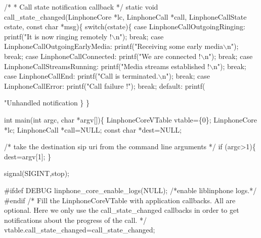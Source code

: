 \begin{DoxyCodeInclude}
\textcolor{comment}{/*}
\textcolor{comment}{ * Call state notification callback}
\textcolor{comment}{ */}
\textcolor{keyword}{static} \textcolor{keywordtype}{void} call\_state\_changed(LinphoneCore *lc, LinphoneCall *call, 
      LinphoneCallState cstate, \textcolor{keyword}{const} \textcolor{keywordtype}{char} *msg)\{
        \textcolor{keywordflow}{switch}(cstate)\{
                \textcolor{keywordflow}{case} LinphoneCallOutgoingRinging:
                        printf(\textcolor{stringliteral}{"It is now ringing remotely !\(\backslash\)n"});
                \textcolor{keywordflow}{break};
                \textcolor{keywordflow}{case} LinphoneCallOutgoingEarlyMedia:
                        printf(\textcolor{stringliteral}{"Receiving some early media\(\backslash\)n"});
                \textcolor{keywordflow}{break};
                \textcolor{keywordflow}{case} LinphoneCallConnected:
                        printf(\textcolor{stringliteral}{"We are connected !\(\backslash\)n"});
                \textcolor{keywordflow}{break};
                \textcolor{keywordflow}{case} LinphoneCallStreamsRunning:
                        printf(\textcolor{stringliteral}{"Media streams established !\(\backslash\)n"});
                \textcolor{keywordflow}{break};
                \textcolor{keywordflow}{case} LinphoneCallEnd:
                        printf(\textcolor{stringliteral}{"Call is terminated.\(\backslash\)n"});
                \textcolor{keywordflow}{break};
                \textcolor{keywordflow}{case} LinphoneCallError:
                        printf(\textcolor{stringliteral}{"Call failure !"});
                \textcolor{keywordflow}{break};
                \textcolor{keywordflow}{default}:
                        printf(\textcolor{stringliteral}{"Unhandled notification %
        \}
\}

\textcolor{keywordtype}{int} main(\textcolor{keywordtype}{int} argc, \textcolor{keywordtype}{char} *argv[])\{
        LinphoneCoreVTable vtable=\{0\};
        LinphoneCore *lc;
        LinphoneCall *call=NULL;
        \textcolor{keyword}{const} \textcolor{keywordtype}{char} *dest=NULL;

        \textcolor{comment}{/* take the destination sip uri from the command line arguments */}
        \textcolor{keywordflow}{if} (argc>1)\{
                dest=argv[1];
        \}

        signal(SIGINT,stop);

\textcolor{preprocessor}{#ifdef DEBUG}
\textcolor{preprocessor}{}        linphone_core_enable_logs(NULL); \textcolor{comment}{/*enable liblinphone logs.*/}
\textcolor{preprocessor}{#endif}
\textcolor{preprocessor}{}        \textcolor{comment}{/* }
\textcolor{comment}{         Fill the LinphoneCoreVTable with application callbacks.}
\textcolor{comment}{         All are optional. Here we only use the call\_state\_changed callbacks}
\textcolor{comment}{         in order to get notifications about the progress of the call.}
\textcolor{comment}{         */}
        vtable.call_state_changed=call\_state\_changed;

}
\end{DoxyCodeInclude}
